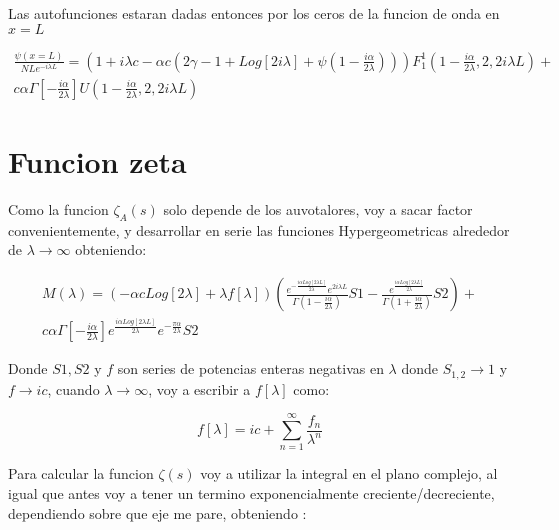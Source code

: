 Las autofunciones estaran dadas entonces por los ceros de la funcion de onda en $x=L$

\begin{equation}
\begin{array}{c}
\frac{\psi (x=L)}{N L e ^{-i \lambda L} }
 = 
\left(
1+ i \lambda c - \alpha c 
\left(
2 \gamma -1 + Log[2 i \lambda] + 
\psi 
( 1 - \frac{i \alpha}{2 \lambda} )
\right)  
\right)
F _1 ^1 (1 - \frac{i \alpha}{2 \lambda},2,2 i \lambda L ) + \\
c \alpha \Gamma [-\frac{i \alpha}{2 \lambda}]
U (1 - \frac{i \alpha}{2 \lambda},2,2 i \lambda L )
\end{array}
\end{equation}

\section{Funcion zeta}

Como la funcion $\zeta _A (s) $ solo depende de los auvotalores, voy a sacar factor convenientemente, y desarrollar en serie las funciones Hypergeometricas alrededor de $\lambda \rightarrow \infty$ obteniendo:

\begin{equation}
\begin{array}{c}
M (\lambda) = 
 (- \alpha c Log[2 \lambda] + \lambda f[ \lambda ] ) 
 \left(
 \frac{e ^{ - \frac{i \alpha Log[2 \lambda L ]}{2 \lambda } } e ^{2 i \lambda L } }
 {\Gamma ( 1 - \frac{i \alpha}{2 \lambda} )} S1 - 
 \frac{e ^{   \frac{i \alpha Log[2 \lambda L ]}{2 \lambda } } }
 	  {\Gamma (1 + \frac{i \alpha}{2 \lambda})} S2 
 \right)  + \\
 c \alpha \Gamma \left[ - \frac{i \alpha}{2 \lambda} \right]
 e ^{ \frac{i \alpha Log[2 \lambda L]}{2 \lambda}} 
 e ^{- \frac{\pi \alpha}{2 \lambda}} 
 S2 
\end{array}
\end{equation}

Donde $S1,S2$ y $f$ son series de potencias enteras negativas en $\lambda$ donde $S _{1,2} \rightarrow 1$ y $f \rightarrow i c$, cuando $\lambda \rightarrow \infty$, voy a escribir a $f[\lambda]$ como:

\begin{equation}
f[\lambda] = i c + \sum _{n=1} ^{\infty} \frac{f _n}{\lambda ^n}
\end{equation}



Para calcular la funcion $\zeta (s) $ voy a utilizar la integral en el plano complejo, al igual que antes voy a tener un termino exponencialmente creciente/decreciente, dependiendo sobre que eje me pare, obteniendo : 

